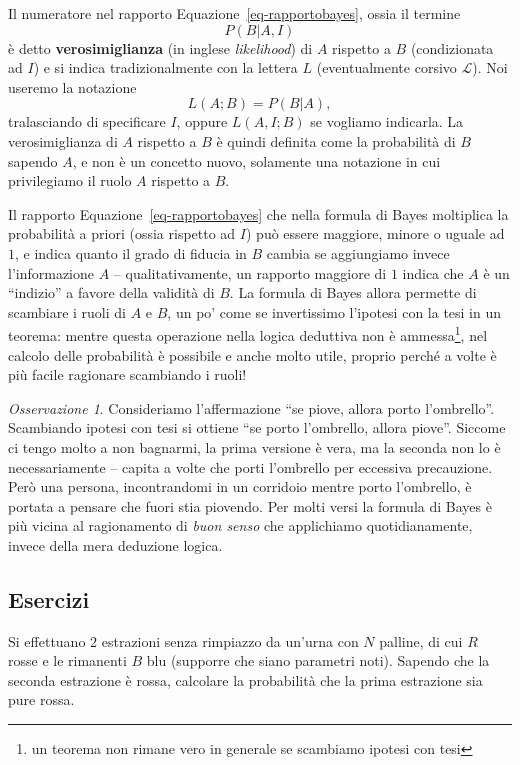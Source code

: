 \documentclass[
  italian,
  letterpaper,
]{book}
\theoremstyle{definition}
\theoremstyle{remark}
\newtheorem*{remark}{Osservazione}
\begin{document}
Il numeratore nel rapporto Equazione~\ref{eq-rapportobayes}, ossia il
termine \[ P(B|A,I)\] è detto \textbf{verosimiglianza} (in inglese
\emph{likelihood}) di \(A\) rispetto a \(B\) (condizionata ad \(I\)) e
si indica tradizionalmente con la lettera \(L\) (eventualmente corsivo
\(\mathcal{L}\)). Noi useremo la notazione \[L(A; B) = P(B|A),\]
tralasciando di specificare \(I\), oppure \(L(A,I;B)\) se vogliamo
indicarla. La verosimiglianza di \(A\) rispetto a \(B\) è quindi
definita come la probabilità di \(B\) sapendo \(A\), e non è un concetto
nuovo, solamente una notazione in cui privilegiamo il ruolo \(A\)
rispetto a \(B\).

Il rapporto Equazione~\ref{eq-rapportobayes} che nella formula di Bayes
moltiplica la probabilità a priori (ossia rispetto ad \(I\)) può essere
maggiore, minore o uguale ad \(1\), e indica quanto il grado di fiducia
in \(B\) cambia se aggiungiamo invece l'informazione \(A\) --
qualitativamente, un rapporto maggiore di \(1\) indica che \(A\) è un
``indizio'' a favore della validità di \(B\). La formula di Bayes allora
permette di scambiare i ruoli di \(A\) e \(B\), un po' come se
invertissimo l'ipotesi con la tesi in un teorema: mentre questa
operazione nella logica deduttiva non è ammessa\footnote{un teorema non
  rimane vero in generale se scambiamo ipotesi con tesi}, nel calcolo
delle probabilità è possibile e anche molto utile, proprio perché a
volte è più facile ragionare scambiando i ruoli!

\begin{remark}
Consideriamo l'affermazione ``se piove, allora porto l'ombrello''.
Scambiando ipotesi con tesi si ottiene ``se porto l'ombrello, allora
piove''. Siccome ci tengo molto a non bagnarmi, la prima versione è
vera, ma la seconda non lo è necessariamente -- capita a volte che porti
l'ombrello per eccessiva precauzione. Però una persona, incontrandomi in
un corridoio mentre porto l'ombrello, è portata a pensare che fuori stia
piovendo. Per molti versi la formula di Bayes è più vicina al
ragionamento di \emph{buon senso} che applichiamo quotidianamente,
invece della mera deduzione logica.
\end{remark}

\subsection{Esercizi}\label{esercizi-5}

Si effettuano \(2\) estrazioni senza rimpiazzo da un'urna con \(N\)
palline, di cui \(R\) rosse e le rimanenti \(B\) blu (supporre che siano
parametri noti). Sapendo che la seconda estrazione è rossa, calcolare la
probabilità che la prima estrazione sia pure rossa.
\end{document}
